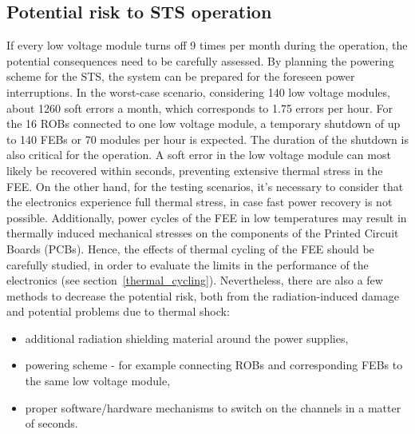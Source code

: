 \subsection{Potential risk to STS operation}
If every low voltage module turns off 9 times per month during the operation, the potential consequences need to be carefully assessed. By planning the powering scheme for the \gls{STS}, the system can be prepared for the foreseen power interruptions. In the worst-case scenario, considering 140 low voltage modules,  about 1260 soft errors a month, which corresponds to 1.75 errors per hour.  For the 16 \glspl{ROB} connected to one low voltage module, a temporary shutdown of up to 140 \glspl{FEB} or 70 modules per hour is expected.  The duration of the shutdown is also critical for the operation. A soft error in the low voltage module can most likely be recovered within seconds, preventing extensive thermal stress in the \gls{FEE}. On the other hand, for the testing scenarios, it's necessary to consider that the electronics experience full thermal stress, in case fast power recovery is not possible. Additionally, power cycles of the \gls{FEE} in low temperatures may result in thermally induced mechanical stresses on the components of the Printed Circuit Boards (\glspl{PCB}). Hence, the effects of thermal cycling of the \gls{FEE} should be carefully studied, in order to evaluate the limits in the performance of the electronics  (see section~\ref{thermal_cycling}). Nevertheless, there are also a few methods to decrease the potential risk, both from the radiation-induced damage and potential problems due to thermal shock:
\begin{itemize}
    \item additional radiation shielding material around the power supplies,
    \item powering scheme - for example connecting \glspl{ROB} and corresponding \glspl{FEB} to the same low voltage module,
    \item proper software/hardware mechanisms to switch on the channels in a matter of seconds.
\end{itemize}
\newpage
